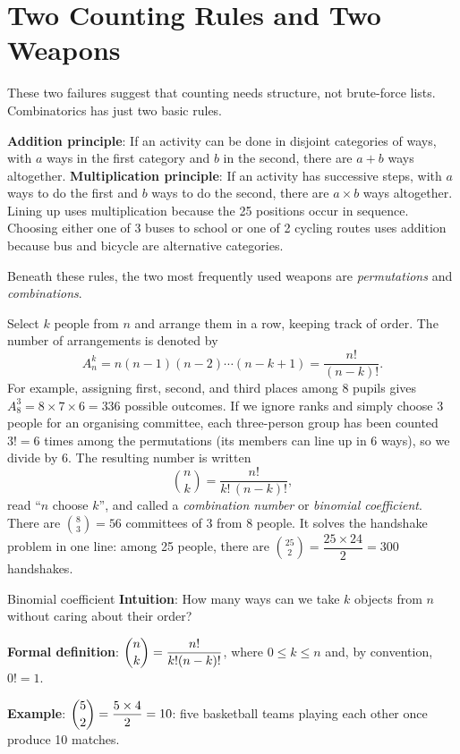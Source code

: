 \section{Two Counting Rules and Two Weapons}

These two failures suggest that counting needs structure, not brute-force lists. Combinatorics has just two basic rules.

\textbf{Addition principle}: If an activity can be done in disjoint categories of ways, with $a$ ways in the first category and $b$ in the second, there are $a+b$ ways altogether. \textbf{Multiplication principle}: If an activity has successive steps, with $a$ ways to do the first and $b$ ways to do the second, there are $a\times b$ ways altogether. Lining up uses multiplication because the 25 positions occur in sequence. Choosing either one of 3 buses to school or one of 2 cycling routes uses addition because bus and bicycle are alternative categories.

Beneath these rules, the two most frequently used weapons are \emph{permutations} and \emph{combinations}.

Select $k$ people from $n$ and arrange them in a row, keeping track of order. The number of arrangements is denoted by
\[
A_n^k=n(n-1)(n-2)\cdots(n-k+1)=\frac{n!}{(n-k)!}.
\]
For example, assigning first, second, and third places among 8 pupils gives $A_8^3=8\times 7\times 6=336$ possible outcomes. If we ignore ranks and simply choose 3 people for an organising committee, each three-person group has been counted $3!=6$ times among the permutations (its members can line up in 6 ways), so we divide by 6. The resulting number is written
\[
\binom{n}{k}=\frac{n!}{k!\,(n-k)!},
\]
read ``$n$ choose $k$'', and called a \emph{combination number} or \emph{binomial coefficient}. There are $\binom{8}{3}=56$ committees of 3 from 8 people. It solves the handshake problem in one line: among 25 people, there are $\binom{25}{2}=\dfrac{25\times 24}{2}=300$ handshakes.

\begin{shuyu}{Binomial coefficient}
\textbf{Intuition}: How many ways can we take $k$ objects from $n$ without caring about their order?

\textbf{Formal definition}: $\dbinom{n}{k}=\dfrac{n!}{k!(n-k)!}$, where $0\le k\le n$ and, by convention, $0!=1$.

\textbf{Example}: $\dbinom{5}{2}=\dfrac{5\times4}{2}=10$: five basketball teams playing each other once produce 10 matches.
\end{shuyu}

